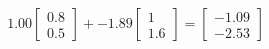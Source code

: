 \documentclass[preview]{standalone}
\begin{document}
\begin{align*}
1.00 \begin{bmatrix} 0.8 \\ 0.5 \end{bmatrix} + -1.89 \begin{bmatrix} 1 \\ 1.6 \end{bmatrix} = \begin{bmatrix} -1.09 \\ -2.53 \end{bmatrix}
\end{align*}
\end{document}
